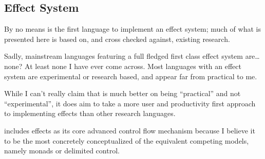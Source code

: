 \subsection{Effect System}
\label{sec:effects}

By no means is \Trilogy{} the first language to implement an effect system;
much of what is presented here is based on, and cross checked against, existing
research\cite{eff}.

Sadly, mainstream languages featuring a full fledged first class effect system
are\dots none? At least none I have ever come across. Most languages with an
effect system are experimental or research based, and appear far from practical
to me.

While I can't really claim that \Trilogy{} is much better on being ``practical''
and not ``experimental'', it does aim to take a more user and productivity first
approach to implementing effects than other research languages.

\Trilogy{} includes effects as its core advanced control flow mechanism because
I believe it to be the most concretely conceptualized of the equivalent competing
models, namely monads or delimited control\cite{effmondel}.
